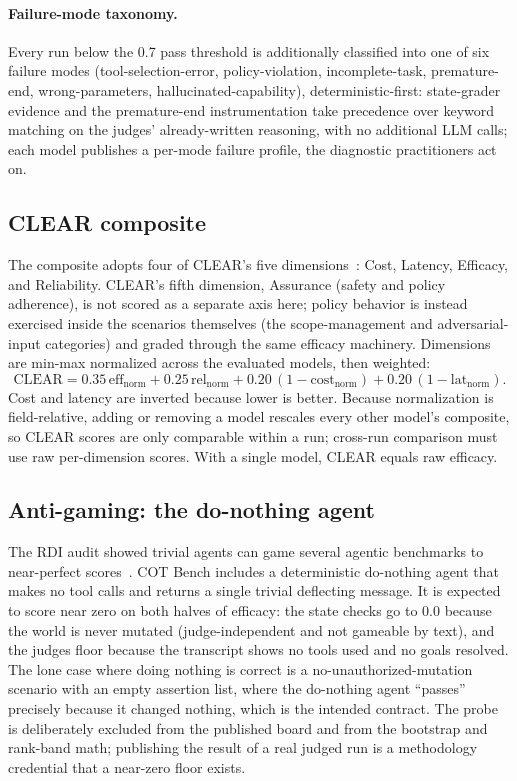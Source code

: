 \paragraph{Failure-mode taxonomy.} Every run below the 0.7 pass threshold is
additionally classified into one of six failure modes (tool-selection-error,
policy-violation, incomplete-task, premature-end, wrong-parameters,
hallucinated-capability), deterministic-first: state-grader evidence and the
premature-end instrumentation take precedence over keyword matching on the
judges' already-written reasoning, with no additional LLM calls; each model
publishes a per-mode failure profile, the diagnostic practitioners act on.

\subsection{CLEAR composite}

The composite adopts four of CLEAR's five dimensions~\cite{clear2025}: Cost,
Latency, Efficacy, and Reliability. CLEAR's fifth dimension, Assurance
(safety and policy adherence), is not scored as a separate axis here; policy
behavior is instead exercised inside the scenarios themselves (the scope-management
and adversarial-input categories) and graded through the same efficacy machinery.
Dimensions are min-max normalized across the evaluated models, then weighted:
\begin{equation}
\text{CLEAR} = 0.35\,\text{eff}_{\text{norm}} + 0.25\,\text{rel}_{\text{norm}} + 0.20\,(1 - \text{cost}_{\text{norm}}) + 0.20\,(1 - \text{lat}_{\text{norm}}).
\end{equation}
Cost and latency are inverted because lower is better. Because normalization is
field-relative, adding or removing a model rescales every other model's composite,
so CLEAR scores are only comparable within a run; cross-run comparison must use raw
per-dimension scores. With a single model, CLEAR equals raw efficacy.

\subsection{Anti-gaming: the do-nothing agent}

The RDI audit showed trivial agents can game several agentic benchmarks to
near-perfect scores~\cite{rdi2026}. COT Bench includes a deterministic do-nothing
agent that makes no tool calls and returns a single trivial deflecting message. It
is expected to score near zero on both halves of efficacy: the state checks go to
0.0 because the world is never mutated (judge-independent and not gameable by
text), and the judges floor because the transcript shows no tools used and no
goals resolved. The lone case where doing nothing is correct is a
no-unauthorized-mutation scenario with an empty assertion list, where the
do-nothing agent ``passes'' precisely because it changed nothing, which is the
intended contract. The probe is deliberately excluded from the published board and
from the bootstrap and rank-band math; publishing the result of a real judged run
is a methodology credential that a near-zero floor exists.

